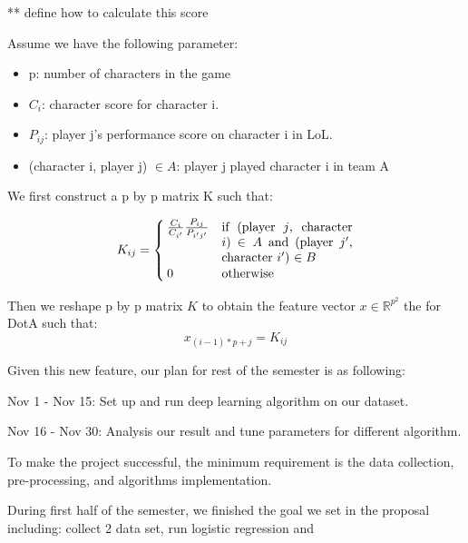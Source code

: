 \documentclass[conference]{IEEEtran}
\begin{document}
** define how to calculate this score

Assume we have the following parameter:
\begin{itemize}
\item p: number of characters in the game
\item $C_i$: character score for character i.
\item $P_{ij}$: player j's performance score on character i in LoL.
\item (character i, player j) $\in A$: player j played character i in team A

\end{itemize}

We first construct a p by p matrix K such that:

\begin{equation*}
K_{ij} =
    \begin{cases}
        \frac{C_i}{C_{i'}} \frac{P_{ij}}{P_{i'j'}} & \parbox[t]{.3\textwidth}{if (player $j$, character $i$) $\in A$ and (player $j'$, character $i'$) $\in B$  }\\
        0 & \text{otherwise}
    \end{cases}
\end{equation*}

Then we reshape p by p matrix $K$ to obtain the feature vector $x \in \mathbb{R}^{p^2}$ the for DotA such that:
\[
x_{(i-1)*p + j} = K_{ij}
\]

Given this new feature, our plan for rest of the semester is as following:

Nov 1 - Nov 15: Set up and run deep learning algorithm on our dataset.

Nov 16 - Nov 30: Analysis our result and tune parameters for different algorithm.

To make the project successful, the minimum requirement is the data collection, pre-processing, and algorithms implementation.



During first half of the semester, we finished the goal we set in the proposal including: collect 2 data set, run logistic regression and 
%
%
\end{document}
